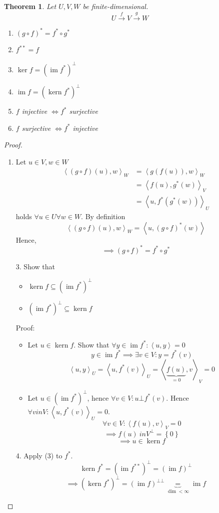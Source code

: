 \documentclass{article}
\newcounter{lecref}[section]
\numberwithin{lecref}{section}
\newtheorem{theorem}[lecref]{Theorem}
\newcommand{\set}[1]{\left\{#1\right\}}
\newcommand{\ip}[2]{\left\langle#1,#2\right\rangle} %
\DeclareMathOperator{\im}{im}
\DeclareMathOperator{\ke}{kern}
\begin{document}
\begin{theorem} %
  Let $U, V, W$ be finite-dimensional.
  \[ U \xrightarrow f V \xrightarrow g W \]
  \begin{enumerate}
    \item $(g \circ f)^* = f^* \circ g^*$
    \item $f^{**} = f$
    \item $\ker{f} = (\im{f^*})^\bot$
    \item $\im{f} = (\ke{f^*})^\bot$
    \item $f$ injective $\iff f^*$ surjective
    \item $f$ surjective $\iff f^*$ injective
  \end{enumerate}
\end{theorem}
\begin{proof}
  \begin{enumerate}
    \item Let $u \in V, w \in W$
      \begin{align*}
        \ip{(g \circ f)(u)}{w}_W &= \ip{g(f(u))}{w}_W \\
          &= \ip{f(u)}{g^*(w)}_V \\
          &= \ip{u}{f^*(g^*(w))}_U
      \end{align*}
      holds $\forall u \in U \forall w \in W$. By definition
      \[ \ip{(g \circ f)(u)}{w}_W = \ip{u}{(g \circ f)^*(w)} \]
      Hence,
      \[ \implies (g \circ f)^* = f^* \circ g^* \]
    \item[3.] Show that
      \begin{itemize}
        \item $\ke{f} \subseteq (\im{f^*})^\bot$
        \item $(\im{f^*})^\bot \subseteq \ke{f}$
      \end{itemize}
      Proof:
      \begin{itemize}
        \item Let $u \in \ke{f}$. Show that $\forall y \in \im{f^*}: \ip uy = 0$
          \[ y \in \im{f^*} \implies \exists v \in V: y = f^*(v) \]
          \[ {\ip uy}_U = \ip{u}{f^*(v)}_U = \ip{\underbrace{f(u)}_{=0}}{v}_V = 0 \]
        \item Let $u \in (\im{f^*})^\bot$, hence $\forall v \in V: u \bot f^*(v)$.
          Hence $\forall v in V: \ip{u}{f^*(v)}_U = 0$.
          \[ \forall v \in V: \ip{f(u)}{v}_V = 0 \]
          \[ \implies f(u) \ in V^\bot = \set{0} \]
          \[ \implies u \in \ke{f} \]
      \end{itemize}
    \item[4.]
      Apply (3) to $f^*$.
      \[ \ke{f^*} = (\im{f^{**}})^\bot = (\im{f})^\bot \]
      \[ \implies \left(\ke{f^*}\right)^\bot = (\im{f})^{\bot\bot} \underbrace{=}_{\dim < \infty} \im{f} \]
  \end{enumerate}
\end{proof}
\end{document}
